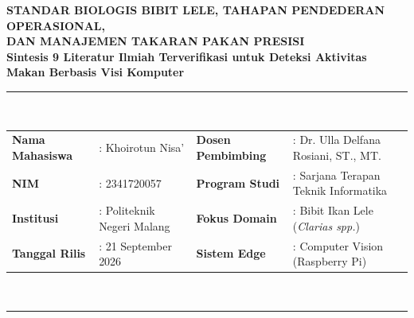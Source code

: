 \documentclass[11pt,a4paper]{article}
\begin{document}
\begin{center}
    {\Large \textbf{\color{blue!80!black}STANDAR BIOLOGIS BIBIT LELE, TAHAPAN PENDEDERAN OPERASIONAL,}}\\[3pt]
    {\Large \textbf{\color{blue!80!black}DAN MANAJEMEN TAKARAN PAKAN PRESISI}}\\[6pt]
    {\normalsize \textbf{Sintesis 9 Literatur Ilmiah Terverifikasi untuk Deteksi Aktivitas Makan Berbasis Visi Komputer}}\\[8pt]
    \rule{\textwidth}{1pt}\\[6pt]
    \noindent
    \begin{tabularx}{\textwidth}{@{}l p{5.2cm} l X@{}}
        \textbf{Nama Mahasiswa} & : Khoirotun Nisa' & \textbf{Dosen Pembimbing} & : Dr. Ulla Delfana Rosiani, ST., MT. \\
        \textbf{NIM} & : 2341720057 & \textbf{Program Studi} & : Sarjana Terapan Teknik Informatika \\
        \textbf{Institusi} & : Politeknik Negeri Malang & \textbf{Fokus Domain} & : Bibit Ikan Lele (\textit{Clarias spp.}) \\
        \textbf{Tanggal Rilis} & : 21 September 2026 & \textbf{Sistem Edge} & : Computer Vision (Raspberry Pi) \\
    \end{tabularx}\\[4pt]
    \rule{\textwidth}{1pt}
\end{center}

\vspace{0.1cm}
\end{document}
